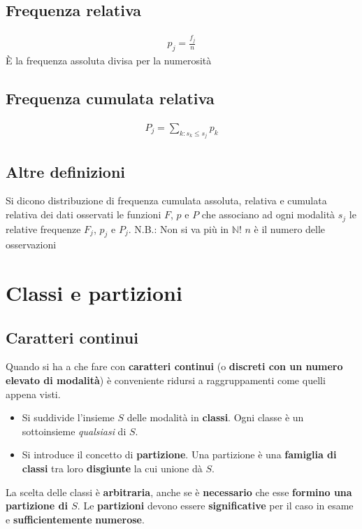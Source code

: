 \subsection{Frequenza relativa}
\begin{align}
p_j = \frac{f_j}{n}
\end{align}
\newline
È la frequenza assoluta divisa per la numerosità

\subsection{Frequenza cumulata relativa}
\begin{align}
P_j = \sum_{k: s_k \leq s_j} p_k
\end{align}

\subsection{Altre definizioni}
Si dicono distribuzione di frequenza cumulata assoluta, relativa e cumulata relativa dei dati osservati le funzioni $F$, $p$ e $P$ che associano ad ogni modalità $s_j$ le relative frequenze $F_j$, $p_j$ e $P_j$. \newline
N.B.: Non si va più in $\mathbb{N}$! \newline
$n$ è il numero delle osservazioni \newline

\section{Classi e partizioni}
\subsection{Caratteri continui}
Quando si ha a che fare con \textbf{caratteri continui} (o \textbf{discreti con un numero elevato di modalità}) è conveniente ridursi a raggruppamenti come quelli appena visti.
\begin{itemize}
	\item Si suddivide l'insieme $S$ delle modalità in \textbf{classi}. Ogni classe è un sottoinsieme \textit{qualsiasi} di $S$.
	\item Si introduce il concetto di \textbf{partizione}. Una partizione è una \textbf{famiglia di classi } tra loro \textbf{disgiunte} la cui unione dà $S$.
\end{itemize}
La scelta delle classi è \textbf{arbitraria}, anche se è \textbf{necessario} che esse \textbf{formino una partizione di $S$}. Le \textbf{partizioni} devono essere \textbf{significative} per il caso in esame e \textbf{sufficientemente} \textbf{numerose}.

